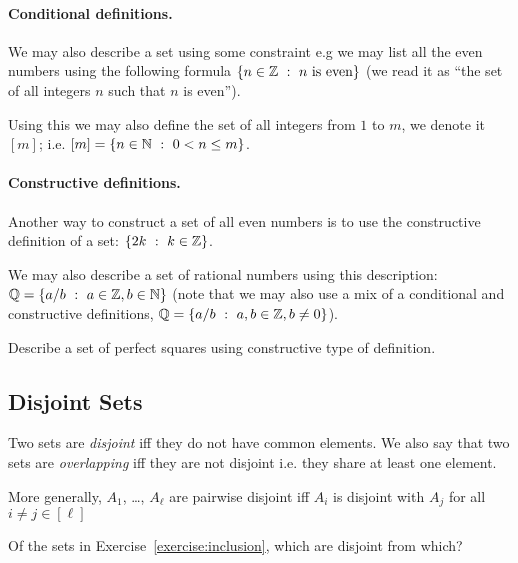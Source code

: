 \paragraph{Conditional definitions.}
We may also describe a set using some constraint e.g we may list all the even
numbers using the following formula $\set[n \text{ is even}]{n \in \Z}$
(we read it as ``the set of all integers $n$ such that $n$ is even'').

Using this we may also define the set of all integers from $1$ to $m$, we
denote it $[m]$; i.e. $[m] = \set[0 < n \le m]{n \in \N}$.


\paragraph{Constructive definitions.} Another way to construct a set of all
even numbers is to use the constructive definition of a set:
$\set[k \in \Z]{2k}$.

We may also describe a set of rational numbers using this description:
$\Q = \set[a \in \Z, b \in \N]{a / b}$ (note that we may also use a mix of
a conditional and constructive definitions,
$\Q = \set[a, b \in \Z, b \neq 0]{a / b}$).

\begin{exercise}
  Describe a set of perfect squares using constructive type of definition.
\end{exercise}

\subsection{Disjoint Sets}
Two sets are \emph{disjoint} iff they do not have common elements. We also
say that two sets are \emph{overlapping} iff they are not disjoint i.e. they
share at least one element.

More generally, $A_1$, \dots, $A_\ell$ are pairwise disjoint iff $A_i$ is
disjoint with $A_j$ for all $i \neq j \in [\ell]$

\begin{exercise}
  Of the sets in Exercise~\ref{exercise:inclusion}, which are disjoint from
  which?
\end{exercise}


